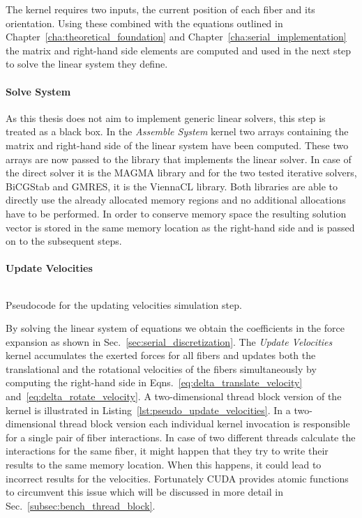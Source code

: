 The kernel requires two inputs, the current position of each fiber and its orientation. Using these combined with the equations outlined in Chapter~\ref{cha:theoretical_foundation} and Chapter~\ref{cha:serial_implementation} the matrix and right-hand side elements are computed and used in the next step to solve the linear system they define.

\paragraph{Solve System}
As this thesis does not aim to implement generic linear solvers, this step is treated as a black box. In the \emph{Assemble System} kernel two arrays containing the matrix and right-hand side of the linear system have been computed. These two arrays are now passed to the library that implements the linear solver. In case of the direct solver it is the MAGMA library and for the two tested iterative solvers, BiCGStab and GMRES, it is the ViennaCL library. Both libraries are able to directly use the already allocated memory regions and no additional allocations have to be performed. In order to conserve memory space the resulting solution vector is stored in the same memory location as the right-hand side and is passed on to the subsequent steps.

\paragraph{Update Velocities}

\begin{listing}[!htbp]
  \centering
  \inputminted[mathescape,
    linenos,
    numbersep=5pt,
    fontsize=\footnotesize,
    frame=lines,
    framesep=2mm]{c}{lst/update_velocities.lst}
  \caption{Pseudocode for the updating velocities simulation step.}
  \label{lst:pseudo_update_velocities}
\end{listing}

By solving the linear system of equations we obtain the coefficients in the force expansion as shown in Sec.~\ref{sec:serial_discretization}. The \emph{Update Velocities} kernel accumulates the exerted forces for all fibers and updates both the translational and the rotational velocities of the fibers simultaneously by computing the right-hand side in Eqns.~\eqref{eq:delta_translate_velocity} and~\eqref{eq:delta_rotate_velocity}. A two-dimensional thread block version of the kernel is illustrated in Listing~\ref{lst:pseudo_update_velocities}. In a two-dimensional thread block version each individual kernel invocation is responsible for a single pair of fiber interactions. In case of two different threads calculate the interactions for the same fiber, it might happen that they try to write their results to the same memory location. When this happens, it could lead to incorrect results for the velocities. Fortunately CUDA provides atomic functions to circumvent this issue which will be discussed in more detail in Sec.~\ref{subsec:bench_thread_block}. 

